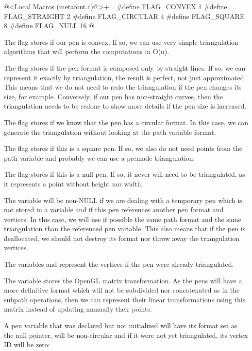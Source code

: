 \iniciocodigo
@<Local Macros (metafont.c)@>+=
#define FLAG_CONVEX   1
#define FLAG_STRAIGHT 2
#define FLAG_CIRCULAR 4
#define FLAG_SQUARE   8
#define FLAG_NULL    16
@
\fimcodigo

The flag  stores if our pen is convex. If so,
we can use very simple triangulation algorithms that will perform the
computations in O(n).

The flag  stores if the pen format is
composed only by straight lines. If so, we can represent it exactly by
triangulation, the result is perfect, not just approximated. This
means that we do not need to redo the triangulation if the pen changes
its size, for example. Conversely, if our pen has non-straight curves,
then the triangulation needs to be redone to show more details if the
pen size is increased. 

The flag  stores if we know that the pen has
a circular format. In this case, we can generate the triangulation
without looking at the path variable format.

The flag  stores if this is a square pen. If
so, we also do not need points from the path variable and probably we
can use a premade triangulation.

The flag  stores if this is a null pen. If so,
it never will need to be triangulated, as it represents a point
without height nor width.

The variable  will be non-NULL if we are
dealing with a temporary pen which is not stored in a variable and if
this pen references another pen format and vertices. In this case, we
will use if possible the same path format and the same triangulation
than the referenced pen variable. This also means that if the pen is
deallocated, we should not destroy its format nor throw away the
triangulation vertices.

The variables 
and  represent the vertices if the
pen were already triangulated.

The variable  stores the OpenGL matrix
transformation. As the pens will have a more definitive format which
will not be subdivided nor concatenated as in the subpath operations,
then we can represent their linear transformations using this matrix
instead of updating manually their points.

A pen variable that was declared but not initialized will have its
format set as the null pointer, will be non-circular and if it were
not yet triangulated, its vertex ID will be zero:

